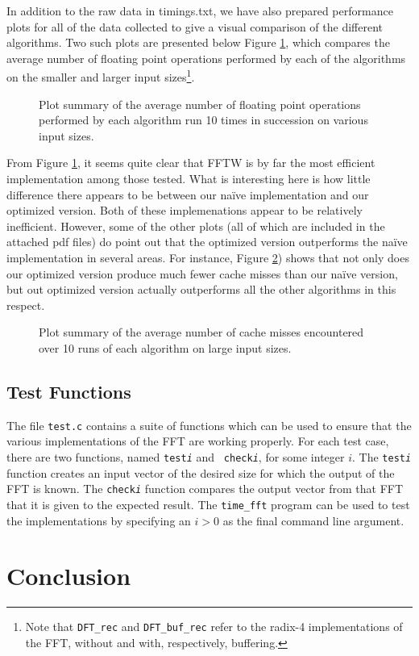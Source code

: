\documentclass[11 pt]{article}
\begin{document}
In addition to the raw data in timings.txt, we have also prepared performance
plots for all of the data collected to give a visual comparison of the
different algorithms.  Two such plots are presented below Figure
\ref{fig:ave_ops}, which compares the average number of floating point
operations performed by each of the algorithms on the smaller and larger input
sizes\footnote{Note that {\tt DFT\_rec} and {\tt DFT\_buf\_rec} refer to the
	radix-4 implementations of the FFT, without and with, respectively,
	buffering.}.

\begin{figure}[!ht]
	\label{fig:ave_ops}
	\begin{center}
		\caption{Plot summary of the average number of floating point operations
			performed by each algorithm run 10 times in succession on various input
			sizes.}
	\end{center}
\end{figure}

From Figure \ref{fig:ave_ops}, it seems quite clear that FFTW is by far the
most efficient implementation among those tested.  What is interesting here is
how little difference there appears to be between our na\"{i}ve implementation
and our optimized version.  Both of these implemenations appear to be
relatively inefficient.  However, some of the other plots (all of which are
included in the attached pdf files) do point out that the optimized version
outperforms the na\"{i}ve implementation in several areas.  For instance, Figure
\ref{fig:cache_misses}) shows that not only does our optimized version produce
much fewer cache misses than our na\"{i}ve version, but out optimized version
actually outperforms all the other algorithms in this respect.

\begin{figure}[!ht]
	\begin{center}
		\caption{\label{fig:cache_misses}Plot summary of the average number of
			cache misses encountered over 10 runs of each algorithm on large input
			sizes.}
	\end{center}
\end{figure}

\subsection{Test Functions}
The file {\tt test.c} contains a suite of functions which can be used to ensure
that the various implementations of the FFT are working properly.  For each
test case, there are two functions, named {\tt test\emph{i}} and {\tt
	check\emph{i}}, for some integer $i$.  The {\tt test\emph{i}} function
creates an input vector of the desired size for which the output of the FFT is
known.  The {\tt check\emph{i}} function compares the output vector from that
FFT that it is given to the expected result.  The {\tt time\_fft} program can
be used to test the implementations by specifying an $i > 0$ as the final
command line argument.

\section{Conclusion}
\end{document}
